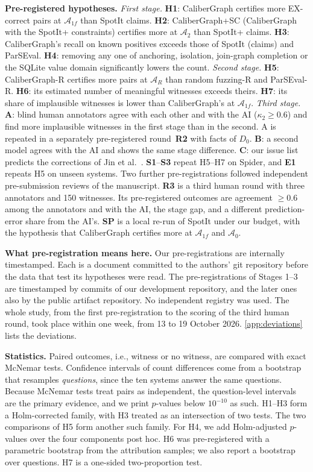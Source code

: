 \textbf{Pre-registered hypotheses.} \emph{First stage.} \textbf{H1}: CaliberGraph certifies more EX-correct pairs at $\mathcal A_{1f}$ than SpotIt claims. \textbf{H2}: CaliberGraph+SC (CaliberGraph with the SpotIt+ constraints) certifies more at $\mathcal A_2$ than SpotIt+ claims. \textbf{H3}: CaliberGraph's recall on known positives exceeds those of SpotIt (claims) and ParSEval. \textbf{H4}: removing any one of anchoring, isolation, join-graph completion or the SQLite value domain significantly lowers the count. \emph{Second stage.} \textbf{H5}: CaliberGraph-R certifies more pairs at $\mathcal A_R$ than random fuzzing-R and ParSEval-R. \textbf{H6}: its estimated number of meaningful witnesses exceeds theirs. \textbf{H7}: its share of implausible witnesses is lower than CaliberGraph's at $\mathcal A_{1f}$. \emph{Third stage.} \textbf{A}: blind human annotators agree with each other and with the AI ($\kappa_2\ge0.6$) and find more implausible witnesses in the first stage than in the second. A is repeated in a separately pre-registered round~\textbf{R2} with facts of $D_0$. \textbf{B}: a second model agrees with the AI and shows the same stage difference. \textbf{C}: our issue list predicts the corrections of Jin et al.~\cite{jin2026annotation}. \textbf{S1}--\textbf{S3} repeat H5--H7 on Spider, and \textbf{E1} repeats H5 on unseen systems. Two further pre-registrations followed independent pre-submission reviews of the manuscript. \textbf{R3} is a third human round with three annotators and 150 witnesses. Its pre-registered outcomes are agreement $\ge0.6$ among the annotators and with the AI, the stage gap, and a different prediction-error share from the AI's. \textbf{SP} is a local re-run of SpotIt under our budget, with the hypothesis that CaliberGraph certifies more at $\mathcal A_{1f}$ and $\mathcal A_0$.

\textbf{What pre-registration means here.} Our pre-registrations are internally timestamped. Each is a document committed to the authors' git repository before the data that test its hypotheses were read. The pre-registrations of Stages 1--3 are timestamped by commits of our development repository, and the later ones also by the public artifact repository. No independent registry was used. The whole study, from the first pre-registration to the scoring of the third human round, took place within one week, from 13 to 19 October 2026. \ref{app:deviations} lists the deviations.

\textbf{Statistics.} Paired outcomes, i.e., witness or no witness, are compared with exact McNemar tests. Confidence intervals of count differences come from a bootstrap that resamples \emph{questions}, since the ten systems answer the same questions. Because McNemar tests treat pairs as independent, the question-level intervals are the primary evidence, and we print $p$-values below $10^{-10}$ as such. H1--H3 form a Holm-corrected family, with H3 treated as an intersection of two tests. The two comparisons of H5 form another such family. For H4, we add Holm-adjusted $p$-values over the four components post hoc. H6 was pre-registered with a parametric bootstrap from the attribution samples; we also report a bootstrap over questions. H7 is a one-sided two-proportion test.


